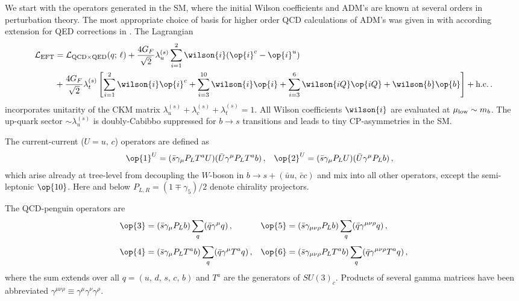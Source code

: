 We start with the operators generated in the SM, where the initial Wilson coefficients
and ADM's are known at several orders in perturbation theory.
The most appropriate choice of basis for higher order QCD calculations of ADM's was
given in \cite{Chetyrkin:1996vx, Chetyrkin:1997gb} with according extension for
QED corrections in \cite{Bobeth:2003at, Huber:2005ig}. The Lagrangian
\begin{equation}
\begin{aligned}
  {\cal L}_{\rm EFT} &
  = {\cal L}_{{\rm QCD} \times {\rm QED}} (q;\, \ell)
  + \frac{4 G_F}{\sqrt{2}} \lambda_{u}^{(s)} \sum_{i=1}^{2} 
     \wilson{i} (\op{i}^c - \op{i}^u)
\\
  & + \frac{4 G_F}{\sqrt{2}} \lambda_{t}^{(s)} \left[
      \sum_{i=1}^{2}  \wilson{i} \op{i}^c
    + \sum_{i=3}^{10} \wilson{i} \op{i}
    + \sum_{i=3}^{6}  \wilson{iQ} \op{iQ}
    + \wilson{b}\op{b} \right] + \mbox{h.c.} \,.
\end{aligned}
\end{equation}
incorporates unitarity of the CKM matrix  $\lambda_u^{(s)} + \lambda_c^{(s)} + 
\lambda_t^{(s)} = 1$. All Wilson coefficients $\wilson{i}$ are evaluated at
$\mu_{\rm low} \sim m_b$. The up-quark
sector $\sim \lambda_u^{(s)}$ is doubly-Cabibbo suppressed for $b\to s$
transitions and leads to tiny CP-asymmetries in the SM.

The current-current ($U = u,\, c$) operators are defined as 
\begin{equation}
\begin{aligned}
  \op{1}^U & = (\bar{s} \gamma_\mu P_L T^a U) (\bar{U} \gamma^\mu P_L T^a b) \,, &
  \op{2}^U & = (\bar{s} \gamma_\mu P_L U) (\bar{U} \gamma^\mu P_L b) \,, 
\end{aligned}
\end{equation}
which arise already at tree-level from decoupling the $W$-boson in $b\to s + 
(\bar{u}u,\, \bar{c}c)$ and mix into all other operators, except the
semi-leptonic $\op{10}$. Here and below $P_{L,R} = (1 \mp \gamma_5)/2$ denote
chirality projectors. 

The QCD-penguin operators are
\begin{equation}
\begin{aligned}
  \op{3} & = (\bar{s} \gamma_\mu P_L b)     \sum_q (\bar{q} \gamma^\mu q) \,, &
  \op{5} & = (\bar{s} \gamma_{\mu\nu\rho} P_L b)
             \sum_q (\bar{q} \gamma^{\mu\nu\rho} q) \,,
\\[1mm] 
  \op{4} & = (\bar{s} \gamma_\mu P_L T^a b) \sum_q (\bar{q} \gamma^\mu T^a q) \,, &
  \op{6} & = (\bar{s} \gamma_{\mu\nu\rho} P_L T^a b) 
             \sum_q (\bar{q} \gamma^{\mu\nu\rho} T^a q) \,,
\end{aligned}
\end{equation}
where the sum extends over all $q = (u,\,d,\,s,\,c,\,b)$ and $T^a$ are the
generators of $SU(3)_c$. Products of several gamma matrices have been
abbreviated $\gamma^{\mu\nu\rho} \equiv \gamma^\mu\gamma^\nu \gamma^\rho$. 

